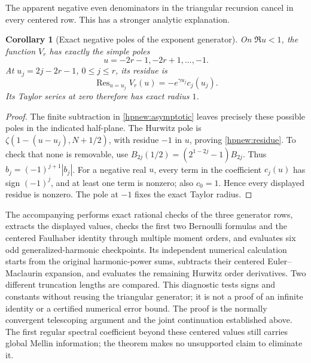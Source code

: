 \documentclass[11pt,a4paper]{article}
\numberwithin{equation}{section}
\newtheorem{corollary}[theorem]{Corollary}
\theoremstyle{definition}
\theoremstyle{remark}
\newcommand{\src}[1]{\texttt{\detokenize{#1}}}
\begin{document}
The apparent negative even denominators in the triangular recursion
cancel in every centered row. This has a stronger analytic explanation.
\begin{corollary}[Exact negative poles of the exponent generator]
\label{hpnew:upoles}
On $\Re u<1$, the function $V_r$ has exactly the simple poles
\[
                     u=-2r-1,-2r+1,\ldots,-1.
\]
At $u_j=2j-2r-1$, $0\le j\le r$, its residue is
\begin{equation}\label{hpnew:residue}
             \operatorname{Res}_{u=u_j}V_r(u)
                        =-e^{\gamma u_j}c_j(u_j).
\end{equation}
Its Taylor series at zero therefore has exact radius $1$.
\end{corollary}

\begin{proof}
The finite subtraction in \eqref{hpnew:asymptotic} leaves precisely
these possible poles in the indicated half-plane. The Hurwitz pole is
$\zeta(1-(u-u_j),N+1/2)$, with residue $-1$ in $u$, proving
\eqref{hpnew:residue}. To check that none is removable, use
$B_{2j}(1/2)=(2^{1-2j}-1)B_{2j}$. Thus
$b_j=(-1)^{j+1}|b_j|$. For a negative real $u$, every term in the
coefficient $c_j(u)$ has sign $(-1)^j$, and at least one term is
nonzero; also $c_0=1$. Hence every displayed residue is nonzero.
The pole at $-1$ fixes the exact Taylor radius.
\end{proof}

The accompanying \src{code/verify_harmonic_powers.py} performs exact
rational checks of the three generator rows, extracts the displayed
values, checks the first two Bernoulli formulas and the centered
Faulhaber identity through multiple moment orders, and evaluates six
odd generalized-harmonic checkpoints. Its independent numerical
calculation starts from the
original harmonic-power sums, subtracts their centered Euler--Maclaurin
expansion, and evaluates the remaining Hurwitz order derivatives.
Two different truncation lengths are compared. This diagnostic tests
signs and constants without reusing the triangular generator; it is
not a proof of an infinite identity or a certified numerical error bound.
The proof is the normally convergent telescoping argument and the
joint continuation established above. The first regular spectral
coefficient beyond these centered values still carries global Mellin
information; the theorem makes no unsupported claim to eliminate it.

\end{document}
